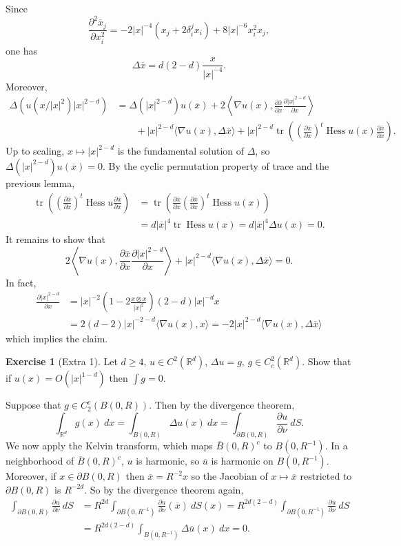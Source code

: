 \documentclass[10pt]{article}
\newcommand{\RR}{\mathbb{R}}
\newcommand{\Hess}{\operatorname{Hess}}
\DeclareMathOperator{\tr}{tr}
\theoremstyle{definition}
\newtheorem{exer}{Exercise}
\begin{document}
Since
$$\frac{\partial^2\overline x_j}{\partial x_i^2} = -2|x|^{-4}(x_j + 2\delta_i^jx_i) + 8|x|^{-6}x_i^2x_j,$$
one has
$$\Delta \overline x = d(2-d)\frac{x}{|x|^{-4}}.$$
Moreover,
\begin{align*}
\Delta (u(x/|x|^2)|x|^{2-d}) &= \Delta(|x|^{2-d})u(\overline x) + 2 \left\langle \nabla u(x), \frac{\partial \overline x}{\partial x} \frac{\partial |x|^{2-d}}{\partial x}\right\rangle \\
&\qquad+ |x|^{2-d}\langle \nabla u(x), \Delta \overline x\rangle + |x|^{2-d} \tr \left(\left(\frac{\partial \overline x}{\partial x}\right)^t \Hess u(x) \frac{\partial \overline x}{\partial x}\right).
\end{align*}
Up to scaling, $x \mapsto |x|^{2-d}$ is the fundamental solution of $\Delta$, so $\Delta(|x|^{2-d})u(\overline x) = 0$.
By the cyclic permutation property of trace and the previous lemma,
\begin{align*}\tr \left(\left(\frac{\partial \overline x}{\partial x}\right)^t \Hess u \frac{\partial \overline x}{\partial x}\right) &= \tr \left(\frac{\partial \overline x}{\partial x} \left(\frac{\partial \overline x}{\partial x}\right)^t \Hess u(x)\right) \\
&= d|\overline x|^4 \tr \Hess u(x) = d|\overline x|^4 \Delta u(x) = 0.
\end{align*}
It remains to show that
$$2 \left\langle \nabla u(x), \frac{\partial \overline x}{\partial x} \frac{\partial |x|^{2-d}}{\partial x}\right\rangle+ |x|^{2-d}\langle \nabla u(x), \Delta \overline x\rangle = 0.$$
In fact,
\begin{align*}\frac{\partial |x|^{2-d}}{\partial x} &= |x|^{-2}\left(1 - 2\frac{x \otimes x}{|x|^2}\right)(2-d)|x|^{-d}x\\
&= 2(d-2)|x|^{-2-d}\langle \nabla u(x), x\rangle = - 2|x|^{2-d}\langle \nabla u(x), \Delta \overline x\rangle
\end{align*}
which implies the claim.


\begin{exer}[Extra 1]
Let $d \geq 4$, $u \in C^2(\RR^d)$, $\Delta u = g$, $g \in C^2_c(\RR^d)$. Show that if $u(x) = O(|x|^{1-d})$ then $\int g = 0$.
\end{exer}

Suppose that $g \in C_2^c(B(0, R))$. Then by the divergence theorem,
$$\int_{\RR^d} g(x)~dx = \int_{B(0, R)} \Delta u(x)~dx = \int_{\partial B(0, R)} \frac{\partial u}{\partial \nu}~dS.$$
We now apply the Kelvin transform, which maps $\overline B(0, R)^c$ to $B(0, R^{-1})$.
In a neighborhood of $\overline B(0, R)^c$, $u$ is harmonic, so $\overline u$ is harmonic on $B(0, R^{-1})$.
Moreover, if $x \in \partial B(0, R)$ then $\overline x = R^{-2}x$ so the Jacobian of $x \mapsto \overline x$ restricted to $\partial B(0, R)$ is $R^{-2d}$. So by the divergence theorem again,
\begin{align*}\int_{\partial B(0, R)} \frac{\partial u}{\partial \nu}~dS& = R^{2d} \int_{\partial B(0, R^{-1})} \frac{\partial u}{\partial \nu}(\overline x)~dS(x) = R^{2d(2-d)} \int_{\partial B(0, R^{-1})} \frac{\partial \overline u}{\partial \nu}~dS\\&
= R^{2d(2-d)} \int_{B(0, R^{-1})} \Delta \overline u(x)~dx = 0.
\end{align*}
\end{document}
